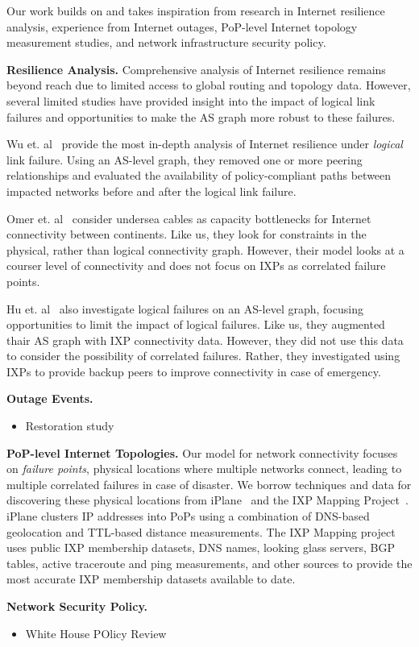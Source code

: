 Our work builds on and takes inspiration from research in Internet resilience analysis, experience from Internet outages, PoP-level Internet topology measurement studies, and network infrastructure security policy.

{\bf Resilience Analysis.}
    Comprehensive analysis of Internet resilience remains beyond reach due to limited access to global routing and topology data. 
    However, several limited studies have provided insight into the impact of logical link failures and opportunities to make the AS graph more robust to these failures.
    
    Wu et. al~\cite{michigan} provide the most in-depth analysis of Internet resilience under {\it logical} link failure.
    Using an AS-level graph, they removed one or more peering relationships and evaluated the availability of policy-compliant paths between impacted networks before and after the logical link failure.

    Omer et. al~\cite{measuringresilience} consider undersea cables as capacity bottlenecks for Internet connectivity between continents. 
    Like us, they look for constraints in the physical, rather than logical connectivity graph. 
    However, their model looks at a courser level of connectivity and does not focus on IXPs as correlated failure points. 
    
    Hu et. al~\cite{ixp-routingdiversity} also investigate logical failures on an AS-level graph, focusing opportunities to limit the impact of logical failures.
    Like us, they augmented thair AS graph with IXP connectivity data.
    However, they did not use this data to consider the possibility of correlated failures.
    Rather, they investigated using IXPs to provide backup peers to improve connectivity in case of emergency. 

{\bf Outage Events.}
\begin{itemize}
    \item Restoration study~\cite{taiwan}
\end{itemize}

{\bf PoP-level Internet Topologies.}
    Our model for network connectivity focuses on {\it failure points}, physical locations where multiple networks connect, leading to multiple correlated failures in case of disaster.
    We borrow techniques and data for discovering these physical locations from iPlane~\cite{iplane} and the IXP Mapping Project~\cite{ixps-mapped}.
    iPlane clusters IP addresses into PoPs using a combination of DNS-based geolocation and TTL-based distance measurements.
    The IXP Mapping project uses public IXP membership datasets, DNS names, looking glass servers, BGP tables, active traceroute and ping measurements, and other sources to provide the most accurate IXP membership datasets available to date. 

{\bf Network Security Policy.}
    \begin{itemize}
        \item White House POlicy Review~\cite{cyberspacepolicy} 
    \end{itemize}

